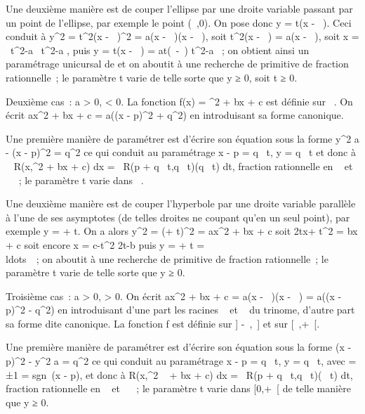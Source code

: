 \documentclass[]{article}
\begin{document}
Une deuxième manière est de couper l'ellipse \Gamma par une droite variable
passant par un point de l'ellipse, par exemple le point (\alpha~,0). On pose
donc y = t(x - \alpha~). Ceci conduit à y^2 = t^2(x -
\alpha~)^2 = a(x - \alpha~)(x - \beta~), soit t^2(x - \alpha~) = a(x - \beta~),
soit x = \alpha~t^2-a\beta~ \over t^2-a ,
puis y = t(x - \alpha~) = at(\beta~-\alpha~) \over t^2-a ~;
on obtient ainsi un paramétrage unicursal de \Gamma et on aboutit à une
recherche de primitive de fraction rationnelle~; le paramètre t varie de
telle sorte que y ≥ 0, soit t ≥ 0.

Deuxième cas~: a \textgreater{} 0, \Delta \textless{} 0. La fonction f(x) =
\sqrtax^2  + bx + c est définie sur ~. On
écrit ax^2 + bx + c = a((x - p)^2 +
q^2) en introduisant sa forme canonique.

Une première manière de paramétrer \Gamma est d'écrire son équation sous la
forme  y^2 \over a - (x - p)^2
= q^2 ce qui conduit au paramétrage x - p =
q\mathrmsh~ t, y =
q\sqrta\mathrmch~
t et donc à \int ~
R(x,\sqrtax^2  + bx + c) dx
=\int ~ R(p +
q\mathrmsh~
t,q\sqrta\mathrmch~
t)(q\mathrmch~ t) dt,
fraction rationnelle en
\mathrmsh~ et
\mathrmch~ ~; le paramètre t
varie dans ~.

Une deuxième manière est de couper l'hyperbole \Gamma par une droite variable
parallèle à l'une de ses asymptotes (de telles droites ne coupant \Gamma
qu'en un seul point), par exemple y = \sqrtax + t. On
a alors y^2 = (\sqrtax + t)^2 =
ax^2 + bx + c soit 2tx\sqrta +
t^2 = bx + c soit encore x = c-t^2
\over 2t\sqrta-b puis y =
\sqrtax + t =
\\ldots~~; on
aboutit à une recherche de primitive de fraction rationnelle~; le
paramètre t varie de telle sorte que y ≥ 0.

Troisième cas~: a \textgreater{} 0, \Delta \textgreater{} 0. On écrit
ax^2 + bx + c = a(x - \alpha~)(x - \beta~) = a((x - p)^2 -
q^2) en introduisant d'une part les racines \alpha~ et \beta~ du
trinome, d'autre part sa forme dite canonique. La fonction f est définie
sur {]} -\infty~,\alpha~{]} et sur {[}\beta~,+\infty~{[}.

Une première manière de paramétrer \Gamma est d'écrire son équation sous la
forme (x - p)^2 - y^2 \over a =
q^2 ce qui conduit au paramétrage x - p =
q\epsilon\mathrmch~ t, y =
q\sqrta\mathrmsh~
t, avec \epsilon = ±1 = sgn~(x - p), et donc à
\int  R(x,\sqrtax^2 ~
+ bx + c) dx =\int ~ R(p +
q\epsilon\mathrmch~
t,q\sqrta\mathrmsh~
t)(\epsilonq\mathrmsh~ t) dt,
fraction rationnelle en
\mathrmsh~ et
\mathrmch~ ~; le paramètre t
varie dans {[}0,+\infty~{[} de telle manière que y ≥ 0.
\end{document}
